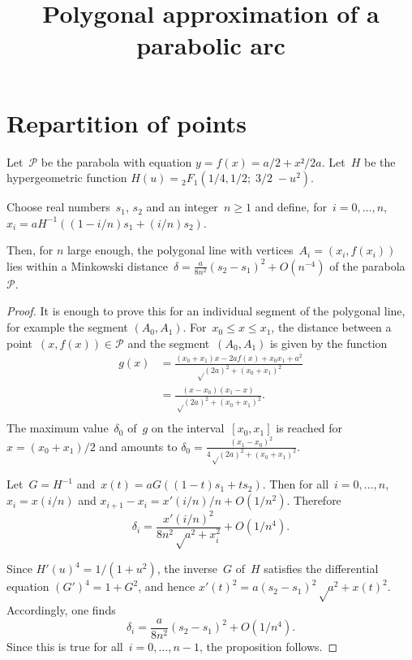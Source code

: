 \documentclass{article}
\begin{document}
\title{Polygonal approximation of a parabolic arc}


\section{Repartition of points}
\begin{prop}\label{prop:points}
Let~$𝒫$ be the parabola with equation $y = f(x) = a/2 + x²/2a$.
Let~$H$ be the hypergeometric function
$H(u) = {}_2F_1(1/4,1/2;\;3/2\;-u^2)$.

Choose real numbers~$s_1$, $s_2$ and an integer~$n ≥ 1$
and define, for~$i = 0, …, n$,
$x_i = a H^{-1}((1-i/n) s_1 + (i/n) s_2)$.

Then, for $n$ large enough,
the polygonal line with vertices~$A_i = (x_i, f(x_i))$
lies within a Minkowski distance~$δ = \frac{a}{8n^2}
(s_2-s_1)^2+O(n^{-4})$ of the parabola~$𝒫$.
\end{prop}

\begin{proof}
It is enough to prove this for an individual segment of the polygonal line,
for example the segment $(A_0, A_1)$.
For~$x_0 ≤ x ≤ x_1$, the distance between a point~$(x, f(x)) ∈ 𝒫$
and the segment~$(A_0, A_1)$ is given by the function
\begin{equation}\begin{split}
g(x)
 &= \frac{(x_0+x_1) x - 2a f(x) + x_0 x_1 + a^2}{√{(2a)^2+(x_0+x_1)^2}}\\
 &= \frac{(x-x_0)(x_1-x)}{√{(2a)^2+(x_0+x_1)^2}}.\\
\end{split}\end{equation}
The maximum value~$δ_0$ of~$g$ on the interval~$[x_0,x_1]$
is reached for~$x = (x_0+x_1)/2$
and amounts to $δ_0 = \frac{(x_1-x_0)^2}{4√{(2a)^2+(x_0+x_1)^2}}$.

Let~$G = H^{-1}$ and~$x(t) = a G((1-t) s_1 + t s_2)$.
Then for all~$i = 0,…, n$, $x_i = x(i/n)$
and $x_{i+1} - x_i = x'(i/n)/n + O(1/n^2)$.
Therefore
\begin{equation}
δ_i = \frac{x'(i/n)^2}{8n^2 √{a^2 + x_i^2}} + O(1/n^4).
\end{equation}

Since $H'(u)^4 = 1/(1+u^2)$,
the inverse~$G$ of~$H$ satisfies the differential equation
$(G')^4 = 1 + G^2$,
and hence $x'(t)^2 = a (s_2 - s_1)^2 √{a^2 + x(t)^2}$.
Accordingly, one finds
\begin{equation}
δ_i = \frac{a}{8n^2} (s_2-s_1)^2 + O(1/n^4).
\end{equation}
Since this is true for all~$i = 0,…,n-1$, the proposition follows.
\end{proof}
\end{document}
